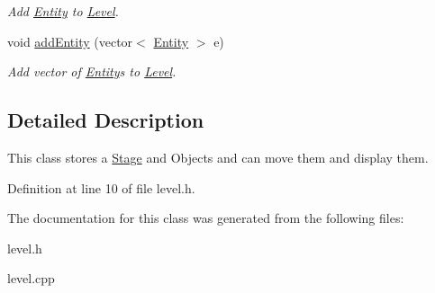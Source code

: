 \begin{DoxyCompactItemize}
\begin{DoxyCompactList}\small\item\em Add \hyperlink{classEntity}{Entity} to \hyperlink{classLevel}{Level}. \end{DoxyCompactList}\item 
void \hyperlink{classLevel_a6c4584d5aa383888461406de600a43c1}{add\+Entity} (vector$<$ \hyperlink{classEntity}{Entity} $>$ e)\hypertarget{classLevel_a6c4584d5aa383888461406de600a43c1}{}\label{classLevel_a6c4584d5aa383888461406de600a43c1}

\begin{DoxyCompactList}\small\item\em Add vector of \hyperlink{classEntity}{Entity}\textquotesingle{}s to \hyperlink{classLevel}{Level}. \end{DoxyCompactList}\end{DoxyCompactItemize}


\subsection{Detailed Description}
This class stores a \hyperlink{classStage}{Stage} and Objects and can move them and display them. 

Definition at line 10 of file level.\+h.



The documentation for this class was generated from the following files\+:\begin{DoxyCompactItemize}
\item 
level.\+h\item 
level.\+cpp\end{DoxyCompactItemize}
